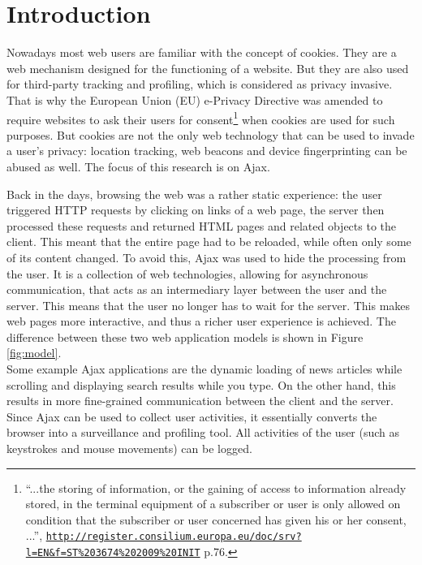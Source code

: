 \section{Introduction}
	
Nowadays most web users are familiar with the concept of cookies. They are a web mechanism designed for the functioning of a website. But they are also used for third-party tracking and profiling, which is considered as privacy invasive. That is why the European Union (EU) e-Privacy Directive was amended to require websites to ask their users for consent\footnote{``...the storing of information, or the gaining of access to information already stored, in the terminal equipment of a subscriber or user is only allowed on condition that the subscriber or user concerned has given his or her consent, ...'', \href{http://register.consilium.europa.eu/doc/srv?l=EN\&f=ST\%203674\%202009\%20INIT}{\nolinkurl{http://register.consilium.europa.eu/doc/srv?l=EN\&f=ST\%203674\%202009\%20INIT}} p.76.} when cookies are used for such purposes. But cookies are not the only web technology that can be used to invade a user's privacy: location tracking, web beacons and device fingerprinting can be abused as well. The focus of this research is on Ajax.
	
Back in the days, browsing the web was a rather static experience: the user triggered HTTP requests by clicking on links of a web page, the server then processed these requests and returned HTML pages and related objects to the client. This meant that the entire page had to be reloaded, while often only some of its content changed. To avoid this, Ajax was used to hide the processing from the user. It is a collection of web technologies, allowing for asynchronous communication, that acts as an intermediary layer between the user and the server. This means that the user no longer has to wait for the server. This makes web pages more interactive, and thus a richer user experience is achieved. The difference between these two web application models is shown in Figure \ref{fig:model}.\\
Some example Ajax applications are the dynamic loading of news articles while scrolling and displaying search results while you type. On the other hand, this results in more fine-grained communication between the client and the server. Since Ajax can be used to collect user activities, it essentially converts the browser into a surveillance and profiling tool. All activities of the user (such as keystrokes and mouse movements) can be logged.\\

